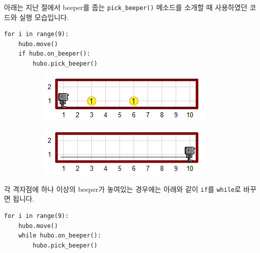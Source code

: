 \documentclass[../main.tex]{subfiles}
\begin{document}
아래는 지난 절에서 beeper를 줍는 \texttt{pick\_beeper()} 메소드를 소개할 때 사용하였던 코드와 실행 모습입니다.
\begin{verbatim}
for i in range(9):
	hubo.move()
	if hubo.on_beeper():
		hubo.pick_beeper()
\end{verbatim}
\begin{figure}[H]
\centering
\begin{subfigure}{.5\textwidth}
\centering
\includegraphics[width=.9\linewidth]{"./lectures/lecture5_pickbeeperbef"}
\label{fig:lecture5pickbeeperbef2}
\end{subfigure}%
\begin{subfigure}{.5\textwidth}
\centering
\includegraphics[width=.9\linewidth]{"./lectures/lecture5_pickbeeperaft"}
\label{fig:lecture5pickbeeperaft2}
\end{subfigure}
\end{figure}
각 격자점에 하나 이상의 beeper가 놓여있는 경우에는 아래와 같이 \texttt{if}를 \texttt{while}로 바꾸면 됩니다.
\begin{verbatim}
for i in range(9):
	hubo.move()
	while hubo.on_beeper():
		hubo.pick_beeper()
\end{verbatim}
\end{document}

